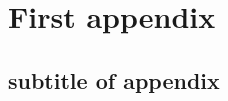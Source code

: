 
\appendix

\chapter{First appendix} %
\label{chp:appendices}

\section{subtitle of appendix} %
\label{sec:first_appendix}

\lipsum[1]
